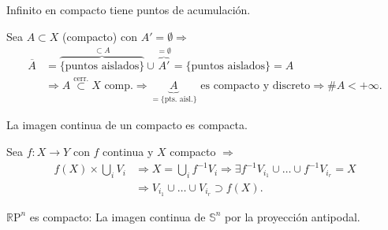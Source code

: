\begin{prop}[Mantra 2]
Infinito en compacto tiene puntos de acumulación.
\end{prop}
\begin{demo}
Sea $A \subset X$ (compacto) con $A' = \emptyset \Rightarrow$
\begin{align*}
    \overline{A} &= \overbrace{\{\text{puntos aislados}\}}^{\subset A}  \cup \overbrace{A'}^{= \emptyset} = \{\text{puntos aislados}\} = A\\
     &\Rightarrow A \stackrel{\text{cerr.}}{\subset} X \text{ comp.} \Rightarrow \underbrace{A}_{= \{\text{pts. aisl.}\}} \text{ es compacto y discreto} \Rightarrow \#A < +\infty   
.\end{align*}
\end{demo}

\begin{prop}[Mantra 3]
La imagen continua de un compacto es compacta. 
\end{prop}
\begin{demo}
Sea $f: X \rightarrow Y$ con $f$ continua y $X$ compacto $\Rightarrow$
\begin{align*}
    f\left( X \right) \times \bigcup_{i} V_i &\Rightarrow X = \bigcup_{i} f^{-1} V_i \Rightarrow \exists f^{-1}V_{i_1} \cup \ldots \cup f^{-1}V_{i_r} = X\\
     &\Rightarrow V_{i_1} \cup \ldots \cup V_{i_r} \supset f\left( X \right) 
.\end{align*}
\end{demo}

\begin{ej}
$\mathbb{R} \mathrm{P}^n$ es compacto: La imagen continua de $\mathbb{S}^n$ por la proyección antipodal. 
\end{ej}

